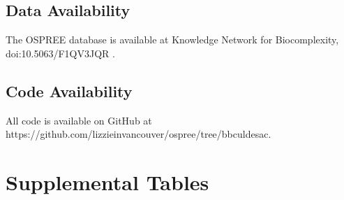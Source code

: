 \documentclass{article}
\begin{document}
\subsection*{Data Availability} 
The OSPREE database is available at Knowledge Network for Biocomplexity, doi:10.5063/F1QV3JQR \emph{\citep{wolkovich2019}}.


\subsection*{Code Availability} 
All code is available on GitHub at https://github.com/lizzieinvancouver/ospree/tree/bbculdesac.


\newpage

\newpage
\section* {Supplemental Tables}
\newpage
\end{document}

